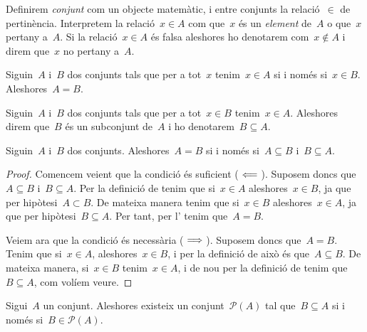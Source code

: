 \documentclass[../../main.tex]{subfiles}
\begin{document}
    Definirem \emph{conjunt} com un objecte matemàtic, i entre conjunts la relació~\(\in\) de pertinència.
    Interpretem la relació~\(x\in A\) com que~\(x\) és un \emph{element} de~\(A\) o que~\(x\) pertany a~\(A\).
    Si la relació~\(x\in A\) és falsa aleshores ho denotarem com~\(x\notin A\) i direm que~\(x\) no pertany a~\(A\).
    \begin{axiom}
        \label{axiom:axioma d'extensionalitat}
        Siguin~\(A\) i~\(B\) dos conjunts tals que per a tot~\(x\) tenim~\(x\in A\) si i només si~\(x\in B\).
        Aleshores~\(A=B\).
    \end{axiom}
    \begin{definition}[Subconjunt]
        \label{def:subconjunt}
        Siguin~\(A\) i~\(B\) dos conjunts tals que per a tot~\(x\in B\) tenim~\(x\in A\).
        Aleshores direm que~\(B\) és un subconjunt de~\(A\) i ho denotarem~\(B\subseteq A\).
    \end{definition}
    \begin{theorem}
        \label{thm:doble inclusió}
        Siguin~\(A\) i~\(B\) dos conjunts.
        Aleshores~\(A=B\) si i només si~\(A\subseteq B\) i~\(B\subseteq A\).
    \end{theorem}
    \begin{proof}
        Comencem veient que la condició és suficient (\(\impliedby\)).
        Suposem doncs que~\(A\subseteq B\) i~\(B\subseteq A\).
        Per la definició de  tenim que si~\(x\in A\) aleshores~\(x\in B\), ja que per hipòtesi~\(A\subset B\).
        De mateixa manera tenim que si~\(x\in B\) aleshores~\(x\in A\), ja que per hipòtesi~\(B\subseteq A\).
        Per tant, per l' tenim que~\(A=B\).

        Veiem ara que la condició és necessària (\(\implies\)).
        Suposem doncs que~\(A=B\).
        Tenim que si~\(x\in A\), aleshores~\(x\in B\), i per la definició de  això és que~\(A\subseteq B\).
        De mateixa manera, si~\(x\in B\) tenim~\(x\in A\), i de nou per la definició de  tenim que~\(B\subseteq A\), com volíem veure.
    \end{proof}
    \begin{axiom}
        \label{axiom:conjunt potència}
        Sigui~\(A\) un conjunt.
        Aleshores existeix un conjunt~\(\mathcal{P}(A)\) tal que~\(B\subseteq A\) si i només si~\(B\in\mathcal{P}(A)\).
    \end{axiom}
\end{document}
